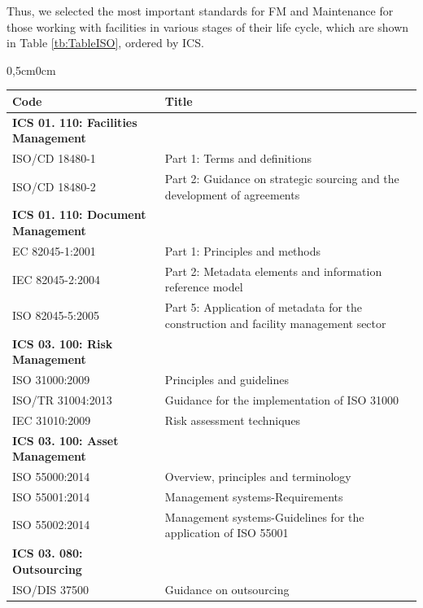 Thus, we selected the most important standards for FM and Maintenance for those working with facilities in various stages of their life cycle, which are shown in Table \ref{tb:TableISO}, ordered by ICS.
\begin{landscape}
\begin{table}[h!]

		\centering
		\vspace{-2cm}
		\begin{adjustwidth}{0,5cm}{0cm}%
		\resizebox{18cm}{!} {
			\begin{tabular}{ll}
				\hline
				{\bf Code} & {\bf Title} \\ 
				\hline

				{\bf ICS 01. 110: Facilities Management} &  \\
				ISO/CD 18480-1  & Part 1: Terms and definitions \\
				ISO/CD 18480-2  & Part 2: Guidance on strategic sourcing and the development of agreements \\
				\hline

				{\bf ICS 01. 110: Document Management} &  \\
				EC 82045-1:2001  & Part 1: Principles and methods \\
				IEC 82045-2:2004  & Part 2: Metadata elements and information reference model \\
				ISO 82045-5:2005 & Part 5: Application of metadata for the construction and facility management sector \\ 
				\hline

				{\bf ICS 03. 100: Risk Management} & \\
				ISO 31000:2009 & Principles and guidelines \\           
				ISO/TR 31004:2013  & Guidance for the implementation of ISO 31000 \\  		  
				IEC 31010:2009  & Risk assessment techniques \\  
				\hline

				{\bf ICS 03. 100: Asset Management}  & \\
				ISO 55000:2014 & Overview, principles and terminology \\ 	            
				ISO 55001:2014 & Management systems-Requirements \\		            
				ISO 55002:2014  & Management systems-Guidelines for the application of ISO 55001 \\  
				\hline

				{\bf ICS 03. 080: Outsourcing} & \\
				ISO/DIS 37500 & Guidance on outsourcing \\ 
				\hline


\end{tabular}}
\end{adjustwidth}
\end{table}
\end{landscape}

